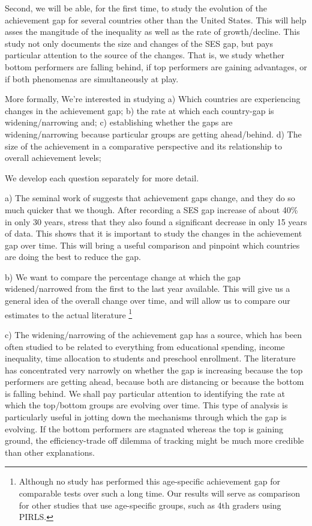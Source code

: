 \documentclass[11pt, a4paper]{article}\usepackage[]{graphicx}\usepackage[]{color}
\begin{document}
Second, we will be able, for the first time, to study the evolution of the achievement gap for several countries other than the United States. This will help asses the mangitude of the inequality as well as the rate of growth/decline. This study not only documents the size and changes of the SES gap, but pays particular attention to the source of the changes. That is, we study whether bottom performers are falling behind, if top performers are gaining advantages, or if both phenomenas are simultaneously at play.

More formally, We're interested in studying
a) Which countries are experiencing changes in the achievement gap;
b) the rate at which each country-gap is widening/narrowing and;
c) establishing whether the gaps are widening/narrowing because particular groups are getting ahead/behind.
d) The size of the achievement in a comparative perspective and its relationship to overall achievement levels;

We develop each question separately for more detail.

a) The seminal work of \citet{reardon2011} suggests that achievement gaps change, and they do so much quicker that we though. After recording a SES gap increase of about 40\% in only 30 years, \citep{reardon_portilla} stress that they also found a significant decrease in only 15 years of data. This shows that it is important to study the changes in the achievement gap over time. This will bring a useful comparison and pinpoint which countries are doing the best to reduce the gap.

b) We want to compare the percentage change at which the gap widened/narrowed from the first to the last year available. This will give us a general idea of the overall change over time, and will allow us to compare our estimates to the actual literature \footnote{Although no study has performed this age-specific achievement gap for comparable tests over such a long time. Our results will serve as comparison for other studies that use age-specific groups, such as 4th graders using PIRLS.}

c) The widening/narrowing of the achievement gap has a source, which has been often studied to be related to everything from educational spending, income inequality, time allocation to students and preschool enrollment. The literature has concentrated very narrowly on whether the gap is increasing because the top performers are getting ahead, because both are distancing or because the bottom is falling behind. We shall pay particular attention to identifying the rate at which the top/bottom groups are evolving over time. This type of analysis is particularly useful in jotting down the mechanisms through which the gap is evolving. If the bottom performers are stagnated whereas the top is gaining ground, the efficiency-trade off dilemma of tracking might be much more credible than other explanations.
\end{document}
